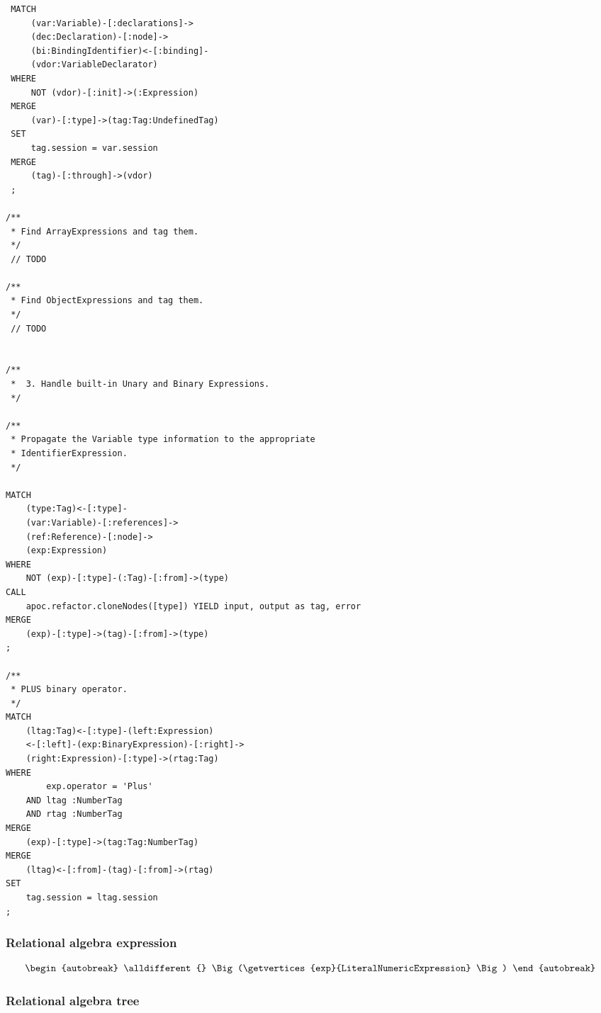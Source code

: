 \begin{lstlisting}
 MATCH
     (var:Variable)-[:declarations]->
     (dec:Declaration)-[:node]->
     (bi:BindingIdentifier)<-[:binding]-
     (vdor:VariableDeclarator)
 WHERE
     NOT (vdor)-[:init]->(:Expression)
 MERGE
     (var)-[:type]->(tag:Tag:UndefinedTag)
 SET
     tag.session = var.session
 MERGE
     (tag)-[:through]->(vdor)
 ;

/**
 * Find ArrayExpressions and tag them.
 */
 // TODO

/**
 * Find ObjectExpressions and tag them.
 */
 // TODO


/**
 *  3. Handle built-in Unary and Binary Expressions.
 */

/**
 * Propagate the Variable type information to the appropriate
 * IdentifierExpression.
 */

MATCH
    (type:Tag)<-[:type]-
    (var:Variable)-[:references]->
    (ref:Reference)-[:node]->
    (exp:Expression)
WHERE
    NOT (exp)-[:type]-(:Tag)-[:from]->(type)
CALL
    apoc.refactor.cloneNodes([type]) YIELD input, output as tag, error
MERGE
    (exp)-[:type]->(tag)-[:from]->(type)
;

/**
 * PLUS binary operator.
 */
MATCH
    (ltag:Tag)<-[:type]-(left:Expression)
    <-[:left]-(exp:BinaryExpression)-[:right]->
    (right:Expression)-[:type]->(rtag:Tag)
WHERE
        exp.operator = 'Plus'
    AND ltag :NumberTag
    AND rtag :NumberTag
MERGE
    (exp)-[:type]->(tag:Tag:NumberTag)
MERGE
    (ltag)<-[:from]-(tag)-[:from]->(rtag)
SET
    tag.session = ltag.session
;
\end{lstlisting}

\subsubsection*{Relational algebra expression}

\begin{align*}
\begin{autobreak}
\alldifferent{} \Big(\getvertices{exp}{LiteralNumericExpression}
\Big)
\end{autobreak}
\end{align*}

\subsubsection*{Relational algebra tree}


